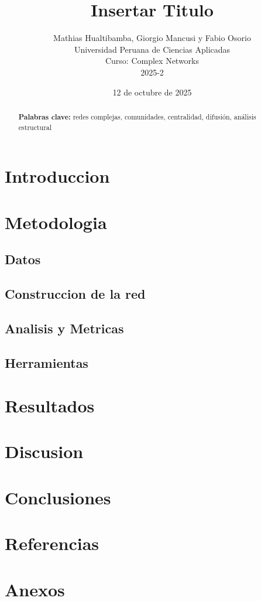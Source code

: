 \documentclass[twocolumn]{article}
\title{Insertar Titulo}
\author{
    Mathias Hualtibamba, Giorgio Mancusi y Fabio Osorio \\
    Universidad Peruana de Ciencias Aplicadas \\
    Curso: Complex Networks \\
    2025-2 
}
\date{12 de octubre de 2025}
\newcommand{\keywords}[1]{\par\noindent\textbf{Palabras clave:} #1}
\begin{document}
\maketitle

\begin{abstract}
\blindtext[1]
\keywords{redes complejas, comunidades, centralidad, difusión, análisis estructural}
\end{abstract}

\section{Introduccion}
\blindtext[2]

\section{Metodologia}
\blindtext[3]

\subsection{Datos}
\blindtext[1]

\subsection{Construccion de la red}
\blindtext[1]

\subsection{Analisis y Metricas}
\blindtext[1]

\subsection{Herramientas}
\blindtext[1]

\section{Resultados}
\blindtext[4]

\section{Discusion}
\blindtext[2]

\section{Conclusiones}
\blindtext[2]

\section{Referencias}
\printbibliography

\section{Anexos}
\blindtext[1
]
\end{document}
